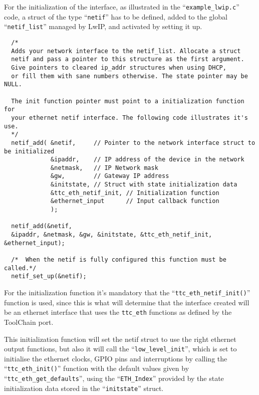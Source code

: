 
For the initialization of the interface, as illustrated in the ``\verb/example_lwip.c/'' code, a struct of the type ``\verb/netif/'' has to be defined, added to the global ``\verb/netif_list/'' managed by LwIP, and activated by setting it up.

\begin{lstlisting}
  /*
  Adds your network interface to the netif_list. Allocate a struct
  netif and pass a pointer to this structure as the first argument.
  Give pointers to cleared ip_addr structures when using DHCP,
  or fill them with sane numbers otherwise. The state pointer may be NULL.

  The init function pointer must point to a initialization function for
  your ethernet netif interface. The following code illustrates it's use.
  */
  netif_add( &netif,     // Pointer to the network interface struct to be initialized
             &ipaddr,    // IP address of the device in the network
             &netmask,   // IP Network mask
             &gw,        // Gateway IP address
             &initstate, // Struct with state initialization data
             &ttc_eth_netif_init, // Initialization function 
             &ethernet_input      // Input callback function
             );
    
  netif_add(&netif,
  &ipaddr, &netmask, &gw, &initstate, &ttc_eth_netif_init, &ethernet_input);

  /*  When the netif is fully configured this function must be called.*/
  netif_set_up(&netif);
\end{lstlisting}

For the initialization function it's mandatory that the ``\verb/ttc_eth_netif_init()/'' function is used, since this is what will determine that the interface created will be an ethernet interface that uses the \verb/ttc_eth/ functions as defined by the ToolChain port.

This initialization function will set the netif struct to use the right ethernet output functions, but also it will call the ``\verb/low_level_init/'', which is set to initialise the ethernet clocks, GPIO pins and interruptions by calling the ``\verb/ttc_eth_init()/'' function with the default values given by ``\verb/ttc_eth_get_defaults/'', using the ``\verb/ETH_Index/'' provided by the state initialization data stored in the ``\verb/initstate/'' struct.

